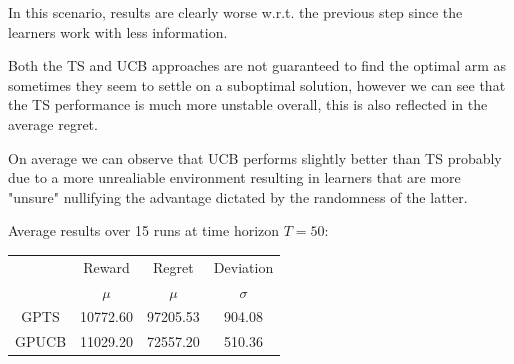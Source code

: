 In this scenario, results are clearly worse w.r.t. the previous step since the learners work with less information.

Both the TS and UCB approaches are not guaranteed to find the optimal arm as sometimes they seem to settle on a suboptimal solution, however we can see that the TS performance is much more unstable overall, this is also reflected in the average regret.

On average we can observe that UCB performs slightly better than TS probably due to a more unrealiable environment resulting in learners that are more "unsure" nullifying the advantage dictated by the randomness of the latter.

Average results over 15 runs at time horizon $T = 50$:

\begin{table}[h]
	\center
	\begin{tabular}{|c|cc|c|}
	\hline \hline
		\cellcolor{blue!25} & Reward 	& Regret	& Deviation \\
	\cline{2-4}
		\cellcolor{blue!25} & $\mu$		& $\mu$		& $\sigma$	\\
	\hline \hline
		GPTS 				& 10772.60	& 97205.53	& 904.08	\\
	\hline
		GPUCB				& 11029.20	& 72557.20	& 510.36	\\
	\hline \hline
	\end{tabular}
\end{table}
